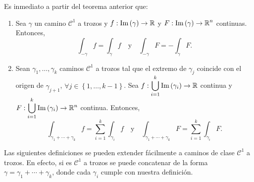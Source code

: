 \begin{colorary}
Es inmediato a partir del teorema anterior que:
\begin{enumerate}
\item Sea $\displaystyle \gamma  $ un camino $\displaystyle \mathcal{C}^{1} $ a trozos y $\displaystyle f : \operatorname{Im}\left(\gamma\right) \to \mathbb{R} $ y $\displaystyle F : \operatorname{Im}\left(\gamma \right)\to \mathbb{R}^{n} $ continuas. Entonces,
	\[\int _{-\gamma }f =\int _{\gamma }f  \quad \text{y} \quad \int _{-\gamma }F =-\int _{\gamma }F.\]
\item Sean $\displaystyle \gamma_{1}, \ldots, \gamma_{k} $ caminos $\displaystyle \mathcal{C}^{1} $ a trozos tal que el extremo de $\displaystyle \gamma_{j} $ coincide con el origen de $\displaystyle \gamma_{j+1} $, $\displaystyle \forall j \in \left\{ 1, \ldots, k - 1\right\}  $. Sea $\displaystyle f:\bigcup_{i = 1}^{k}\operatorname{Im}\left(\gamma_{i}\right)\to \mathbb{R} $ continua y $\displaystyle F:\bigcup_{i = 1}^{k}\operatorname{Im}\left(\gamma_{i}\right)\to \mathbb{R}^{n} $ continua. Entonces,
	\[\int _{\gamma_{1}+\cdots + \gamma_{k}}f =\sum^{k}_{i = 1}\int _{\gamma_{i}}f \quad \text{y}\quad \int _{\gamma_{1} + \cdots + \gamma_{k}}F =\sum^{k}_{i = 1}\int _{\gamma_{i}}F.\]
\end{enumerate}
\end{colorary}
\begin{observation}
Las siguientes definiciones se pueden extender fácilmente a caminos de clase $\displaystyle \mathcal{C}^{1} $ a trozos. En efecto, si es $\displaystyle \mathcal{C}^{1} $ a trozos se puede concatenar de la forma $\displaystyle \gamma = \gamma_{1} + \cdots + \gamma_{k} $, donde cada $\displaystyle \gamma_{i} $ cumple con nuestra definición. 
\end{observation}

